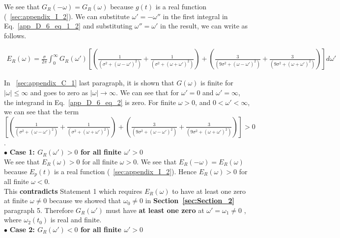 \documentclass[11pt]{elsarticle}
\begin{document}
We see that $G_{R}(-\omega)= G_{R}(\omega)$ because $g(t)$ is a real function (~\ref{sec:appendix_I_2}). We can substitute $\omega' = -\omega''$ in the first integral in Eq.~\ref{app_D_6_eq_1_2} and substituting $\omega'' = \omega'$ in the result, we can write as follows.



\begin{eqnarray*} \label{app_D_6_eq_2}   
E_{R}(\omega) = \frac{\sigma}{2\pi}   \int_{0}^{\infty} G_R(\omega') [  (\frac{1}{(\sigma^{2} + (\omega - \omega')^{2})} + \frac{1}{(\sigma^{2} + (\omega + \omega')^{2})} )+ (\frac{3}{(9\sigma^{2} + (\omega - \omega')^{2})} + \frac{3}{(9\sigma^{2} + (\omega + \omega')^{2})}) ]  d\omega'  
\end{eqnarray*} 
  \begin{equation}\end{equation}

In ~\ref{sec:appendix_C_1} last paragraph, it is shown that $G(\omega)$ is finite for $|\omega| \leq \infty$ and goes to zero as $|\omega| \to \infty$. We can see that for $\omega' = 0$ and $\omega'=\infty$, the integrand in Eq.~\ref{app_D_6_eq_2} is zero. For finite $\omega > 0$, and $0 < \omega' < \infty$, we can see that the term $[  (\frac{1}{(\sigma^{2} + (\omega - \omega')^{2})} + \frac{1}{(\sigma^{2} + (\omega + \omega')^{2})} )+ (\frac{3}{(9\sigma^{2} + (\omega - \omega')^{2})} + \frac{3}{(9\sigma^{2} + (\omega + \omega')^{2})}) ]  > 0$. \\



$\bullet$ \textbf{\textbf{Case 1:} $G_R(\omega') > 0$ for all finite $\omega' > 0$ } \\

We see that $E_{R}(\omega) > 0$ for all finite $\omega > 0$. We see that $E_{R}(-\omega)= E_{R}(\omega)$ because $E_p(t)$ is a real function (~\ref{sec:appendix_I_2}). Hence $E_{R}(\omega) > 0$ for all finite $\omega < 0$.\\

 This \textbf{contradicts} Statement 1 which requires $E_{R}(\omega)$ to have at least one zero at finite $\omega \neq 0$ because we showed that $\omega_0 \neq 0$ in \textbf{Section~\ref{sec:Section_2}} paragraph 5. Therefore $G_{R}(\omega')$ must have\textbf{ at least one zero} at $\omega' =  \omega_1 \neq 0$ , where $\omega_{2}(t_0)$ is real and finite. \\


$\bullet$ \textbf{\textbf{Case 2:} $G_R(\omega') < 0$ for all finite  $\omega' > 0$ } \\
\end{document}
